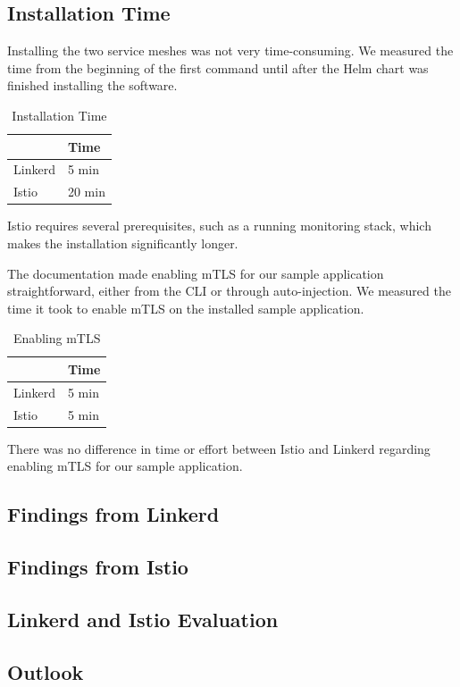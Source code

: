 \subsection{Installation Time}

Installing the two service meshes was not very time-consuming. We measured the time from the beginning of the first command until after the Helm chart was finished installing the software.

\begin{table}[ht]
  \caption{Installation Time}
    \begin{tabular}{| l | l |}
    \hline
    & Time \\
    \hline\hline
    Linkerd & 5 min \\
    \hline
    Istio & 20 min \\
    \hline
    \hline
    \end{tabular}
  \label{tab:installTime}
\end{table}

Istio requires several prerequisites, such as a running monitoring stack, which makes the installation significantly longer.

The documentation made enabling mTLS for our sample application straightforward, either from the CLI or through auto-injection. We measured the time it took to enable mTLS on the installed sample application.

\begin{table}[ht]
  \caption{Enabling mTLS}
    \begin{tabular}{| l | l |}
    \hline
    & Time \\
    \hline\hline
    Linkerd & 5 min \\
    \hline
    Istio & 5 min \\
    \hline
    \hline
    \end{tabular}
  \label{tab:enableTime}
\end{table}

There was no difference in time or effort between Istio and Linkerd regarding enabling mTLS for our sample application.

\subsection{Findings from Linkerd}

\subsection{Findings from Istio}

\subsection{Linkerd and Istio Evaluation}

\subsection{Outlook}
